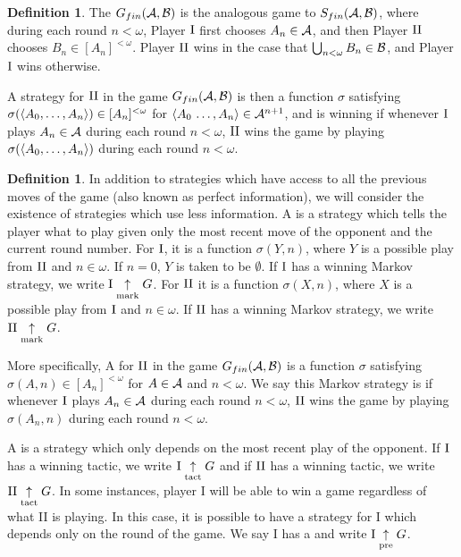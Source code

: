 \documentclass{amsart}
\theoremstyle{plain}
\theoremstyle{definition}
\newtheorem{definition}[theorem]{Definition}
\theoremstyle{remark}
\theoremstyle{plain}
\theoremstyle{definition}
\theoremstyle{remark}
\begin{document}
\begin{definition}
 The  \(G_{fin}(\mathcal{A},\mathcal{B})\) is the analogous game to 
 \(S_{fin}(\mathcal{A},\mathcal{B})\), where during each round \(n<\omega\), Player \(\mathrm{I}\) 
 first chooses \(A_n\in\mathcal{A}\), and then Player \(\mathrm{II}\) chooses \(B_n\in[A_n]^{<\omega}\).
 Player \(\mathrm{II}\) wins in the case that \(\bigcup_{n<\omega}B_n\in\mathcal{B}\), 
 and Player \(\mathrm{I}\) wins otherwise.

 A strategy for \(\mathrm{II}\) in the game \(G_{fin}(\mathcal{A},\mathcal{B})\) is then a function 
 \(\sigma\) satisfying \(\sigma(\langle A_0,\dots,A_n\rangle)\in[A_n]^{<\omega}\) for 
 \(\langle A_0\,\dots,A_n\rangle\in\mathcal{A}^{n+1}\), and is winning if whenever \(\mathrm{I}\) plays 
 \(A_n\in\mathcal{A}\) during each round \(n<\omega\), \(\mathrm{II}\) wins the game by 
 playing \(\sigma(\langle A_0,\dots,A_n\rangle)\) during each round \(n<\omega\).
\end{definition}

\begin{definition}
 In addition to strategies which have access to all the previous moves of the game (also known as perfect information), we will consider the existence of strategies which use less information.
 A  is a strategy which tells the player what to play given only the most recent move of the opponent and the current round number.
 For \(\mathrm{I}\), it is a function \(\sigma(Y,n)\), where \(Y\) is a possible play from \(\mathrm{II}\) and \(n \in \omega\).
 If \(n = 0\), \(Y\) is taken to be \(\emptyset\).
 If \(\mathrm{I}\) has a winning Markov strategy, we write \(\mathrm{I}\underset{\text{mark}}{\uparrow} G\).
 For \(\mathrm{II}\) it is a function \(\sigma(X,n)\), where \(X\) is a possible play from \(\mathrm{I}\) and \(n \in \omega\).
 If \(\mathrm{II}\) has a winning Markov strategy, we write \(\mathrm{II}\underset{\text{mark}}{\uparrow} G\).

 More specifically, A  for \(\mathrm{II}\) in the game \(G_{fin}(\mathcal{A},\mathcal{B})\) is a function \(\sigma\) satisfying \(\sigma(A,n)\in[A_n]^{<\omega}\) for \(A\in\mathcal{A}\) and \(n<\omega\). We say this Markov strategy is  if whenever \(\mathrm{I}\) plays \(A_n\in\mathcal{A}\) during each round \(n<\omega\), \(\mathrm{II}\) wins the game by playing \(\sigma(A_n,n)\) during each round \(n<\omega\).
  
 A  is a strategy which only depends on the most recent play of the opponent.
 If \(\mathrm{I}\) has a winning tactic, we write \(\mathrm{I}\underset{\text{tact}}{\uparrow} G\) and if \(\mathrm{II}\) has a winning tactic, we write \(\mathrm{II}\underset{\text{tact}}{\uparrow} G\).
 In some instances, player I will be able to win a game regardless of what II is playing.
 In this case, it is possible to have a strategy for I which depends only on the round of the game.
 We say I has a  and write \(\mathrm{I}\underset{\text{pre}}{\uparrow} G\). 
\end{definition}
\end{document}
